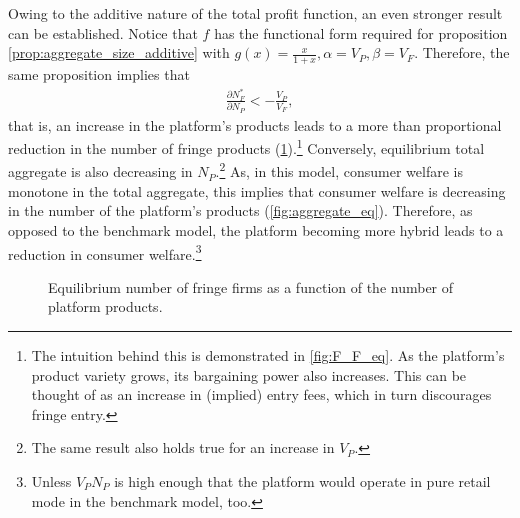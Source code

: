 \documentclass[a4paper]{article}
\begin{document}
Owing to the additive nature of the total profit function, an even stronger result can be established.
Notice that $f$ has the functional form required for proposition \ref{prop:aggregate_size_additive} with $g(x) = \frac{x}{1+x}, \alpha = V_P, \beta = V_F$.
Therefore, the same proposition implies that
\begin{align*}
    \frac{\partial N_F^*}{\partial N_P} < -\frac{V_P}{V_F},
\end{align*}
that is, an increase in the platform's products leads to a more than proportional reduction in the number of fringe products (\cref{fig:fringe_entry_eq}).\footnote{
    The intuition behind this is demonstrated in \cref{fig:F_F_eq}.
    As the platform's product variety grows, its bargaining power also increases.
    This can be thought of as an increase in (implied) entry fees, which in turn discourages fringe entry.
}
Conversely, equilibrium total aggregate is also decreasing in $N_P$.\footnote{
    The same result also holds true for an increase in $V_P$.
}
As, in this model, consumer welfare is monotone in the total aggregate, this implies that consumer welfare is decreasing in the number of the platform's products (\cref{fig:aggregate_eq}).
Therefore, as opposed to the benchmark model, the platform becoming more hybrid leads to a reduction in consumer welfare.\footnote{
    Unless $V_P N_P$ is high enough that the platform would operate in pure retail mode in the benchmark model, too.
}
\begin{figure}
    \centering
    \caption{Equilibrium number of fringe firms as a function of the number of platform products.}
    \label{fig:fringe_entry_eq}
\end{figure}
\end{document}
